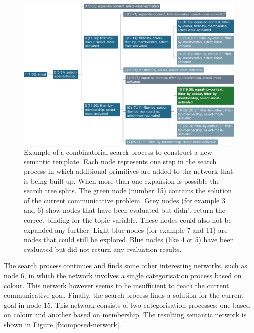 \begin{figure}[htbp]
  \begin{center}
    \includegraphics[width=\textwidth]{./composition/figures/composition-colour.pdf}
    \caption[Example of a combinatorial search process to construct a
    new semantic template]{Example of a combinatorial search process
      to construct a new semantic template. Each node represents one
      step in the search process in which additional primitives are
      added to the network that is being built up. When more than one
      expansion is possible the search tree splits. The green node
      (number 15) contains the solution of the current communicative
      problem. Grey nodes (for example 3 and 6) show nodes that have
      been evaluated but didn't return the correct binding for the
      topic variable. These nodes could also not be expanded any
      further. Light blue nodes (for example 7 and 11) are nodes that
      could still be explored. Blue nodes (like 4 or 5) have been
      evaluated but did not return any evaluation results.}
    \label{f:composition-colour}
  \end{center}
\end{figure}

The search process continues and finds some other interesting
networks, such as node 6, in which the network involves a single
categorisation process based on colour. This network however seems to
be insufficient to reach the current communicative goal. Finally, the
search process finds a solution for the current goal in node 15. This
network consists of two categorisation processes: one based on colour
and another based on membership. The resulting semantic network is
shown in Figure \ref{f:composed-network}.

